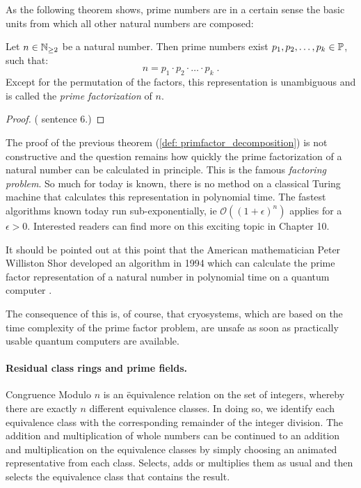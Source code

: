 As the following theorem shows, prime numbers are in a certain sense the basic units from which all other natural numbers are composed:
\begin{theorem}
\label{def: primfactor_decomposition}
Let $ n \in \mathbb{N}_{\geq 2} $ be a natural number. Then prime numbers exist
$ p_1, p_2, \ldots, p_k \in \mathbb{P} $, such that:
\begin{equation}
n = p_1 \cdot p_2 \cdot \ldots \cdot p_k \;.
\end{equation}
Except for the permutation of the factors, this representation is unambiguous and is called the \textit{prime factorization} of $ n $.
\end{theorem}
\begin{proof} (\cite{AL} sentence 6.) 
\end{proof}
\begin{remark}
The proof of the previous theorem (\ref{def: primfactor_decomposition}) is not constructive and the question remains how quickly the prime factorization of a natural number can be calculated in principle. This is the famous \textit{factoring problem}. So much for today is known, there is no method on a classical Turing machine that calculates this representation in polynomial time. The fastest algorithms known today run sub-exponentially, ie $\mathcal{O}((1+ \epsilon)^n)$ applies for a $ \epsilon> 0 $. Interested readers can find more on this exciting topic in \cite{JB} Chapter 10.
\end{remark}
\begin{remark}
It should be pointed out at this point that the American mathematician Peter Williston Shor developed an algorithm in 1994 which can calculate the prime factor representation of a natural number in polynomial time on a quantum computer \cite{PS}.

The consequence of this is, of course, that cryosystems, which are based on the time complexity of the prime factor problem, are unsafe as soon as practically usable quantum computers are available.
\end{remark} 



\paragraph{Residual class rings and prime fields.}
Congruence Modulo $ n $ is an \"equivalence relation on the set of integers, whereby there are exactly $ n $ different equivalence classes. In doing so, we identify each equivalence class with the corresponding remainder of the integer division. The addition and multiplication of whole numbers can be continued to an addition and multiplication on the equivalence classes by simply choosing an animated representative from each class. Selects, adds or multiplies them as usual and then selects the equivalence class that contains the result.

